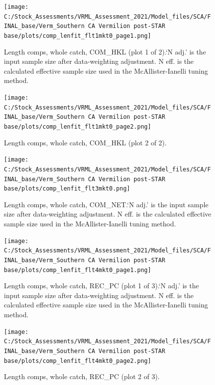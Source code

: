 \documentclass[11pt,
  english,
]{article}
\begin{document}
\leavevmode\tagmcend\tagstructend

\renewcommand{\thepage}{A\arabic{page}}
\renewcommand{\thefigure}{A\arabic{figure}}
\renewcommand{\thetable}{A\arabic{table}}
\setcounter{page}{1}
\setcounter{figure}{0}
\setcounter{table}{0}

\begin{figure}
\centering
\texttt{[image: C:/Stock\_Assessments/VRML\_Assessment\_2021/Model\_files/SCA/FINAL\_base/Verm\_Southern CA Vermilion post-STAR base/plots/comp\_lenfit\_flt1mkt0\_page1.png]}
\caption{Length comps, whole catch, COM\_HKL (plot 1 of 2).`N adj.' is the input sample size after data-weighting adjustment. N eff. is the calculated effective sample size used in the McAllister-Ianelli tuning method.\label{fig:comp_lenfit_flt1mkt0_page1}}
\end{figure}

\begin{figure}
\centering
\texttt{[image: C:/Stock\_Assessments/VRML\_Assessment\_2021/Model\_files/SCA/FINAL\_base/Verm\_Southern CA Vermilion post-STAR base/plots/comp\_lenfit\_flt1mkt0\_page2.png]}
\caption{Length comps, whole catch, COM\_HKL (plot 2 of 2).\label{fig:comp_lenfit_flt1mkt0_page2}}
\end{figure}

\begin{figure}
\centering
\texttt{[image: C:/Stock\_Assessments/VRML\_Assessment\_2021/Model\_files/SCA/FINAL\_base/Verm\_Southern CA Vermilion post-STAR base/plots/comp\_lenfit\_flt3mkt0.png]}
\caption{Length comps, whole catch, COM\_NET.`N adj.' is the input sample size after data-weighting adjustment. N eff. is the calculated effective sample size used in the McAllister-Ianelli tuning method.\label{fig:comp_lenfit_flt3mkt0}}
\end{figure}

\begin{figure}
\centering
\texttt{[image: C:/Stock\_Assessments/VRML\_Assessment\_2021/Model\_files/SCA/FINAL\_base/Verm\_Southern CA Vermilion post-STAR base/plots/comp\_lenfit\_flt4mkt0\_page1.png]}
\caption{Length comps, whole catch, REC\_PC (plot 1 of 3).`N adj.' is the input sample size after data-weighting adjustment. N eff. is the calculated effective sample size used in the McAllister-Ianelli tuning method.\label{fig:comp_lenfit_flt4mkt0_page1}}
\end{figure}

\begin{figure}
\centering
\texttt{[image: C:/Stock\_Assessments/VRML\_Assessment\_2021/Model\_files/SCA/FINAL\_base/Verm\_Southern CA Vermilion post-STAR base/plots/comp\_lenfit\_flt4mkt0\_page2.png]}
\caption{Length comps, whole catch, REC\_PC (plot 2 of 3).\label{fig:comp_lenfit_flt4mkt0_page2}}
\end{figure}
\end{document}

